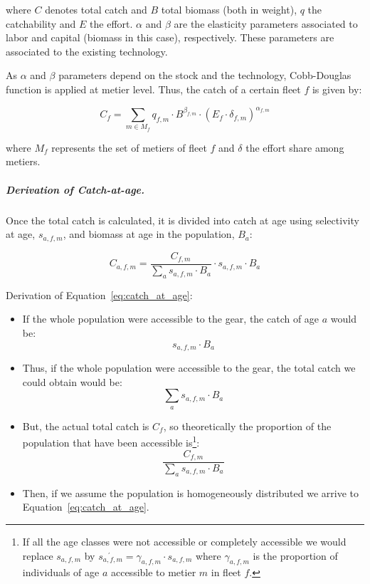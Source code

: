   \noindent	where $C$ denotes total catch and $B$ total biomass (both in weight), $q$ the catchability and $E$ the effort. 
	$\alpha$ and $\beta$ are the elasticity parameters associated to labor and capital 
	(biomass in this case), respectively. These parameters are associated
	to the existing technology. 

	As $\alpha$ and $\beta$ parameters depend on the stock and the technology, Cobb-Douglas function is
	applied at metier level. Thus, the catch of a certain fleet $f$ is given by:

\begin{equation}  \label{eq:Cobb_Doug_fleet}
	C_f = \sum_{m \in M_f} q_{f,m}\cdot B^{\beta _{f,m}} \cdot (E_f\cdot \delta_{f,m})^{\alpha_{f,m}}
\end{equation}
 
	\noindent where $M_f$ represents the set of metiers of fleet $f$ and $\delta$ the effort share among metiers.


	\subparagraph{Derivation of Catch-at-age.}
	Once the total catch is calculated, it is divided into catch at age using selectivity at age, $s_{a,f,m}$, and
	biomass at age in the population, $B_{a}$:
		
	\begin{equation}  \label{eq:catch_at_age}
		C_{a,f,m} = \frac{C_{f,m}}{\sum_a s_{a,f,m}\cdot B_a} \cdot s_{a,f,m}\cdot B_a
	\end{equation}
	
	Derivation of Equation~\ref{eq:catch_at_age}:
			
	\begin{itemize}
		\item If the whole population were accessible to the gear, the catch of age $a$ would be:
			$$s_{a,f,m}\cdot B_a$$
		\item Thus, if the whole population were accessible to the gear, the total catch we could obtain would be:
			$$\sum_a s_{a,f,m}\cdot B_a$$ 
		\item But, the actual total catch is $C_f$, so theoretically the proportion of the population that have been
		  accessible is\footnote{If all the age classes were not accessible or completely accessible
		 we would replace $s_{a,f,m}$ by $\acute{s_{a,f,m}} = \gamma_{a,f,m} \cdot s_{a,f,m}$ where $\gamma_{a,f,m}$ 
		 is the proportion of individuals of age $a$ accessible to metier $m$ in fleet $f$.}:
			$$\frac{C_{f,m}}{\sum_a s_{a,f,m}\cdot B_a}$$ 

		\item Then, if we assume the population is homogeneously distributed we arrive to Equation~\ref{eq:catch_at_age}.
	\end{itemize}
		
